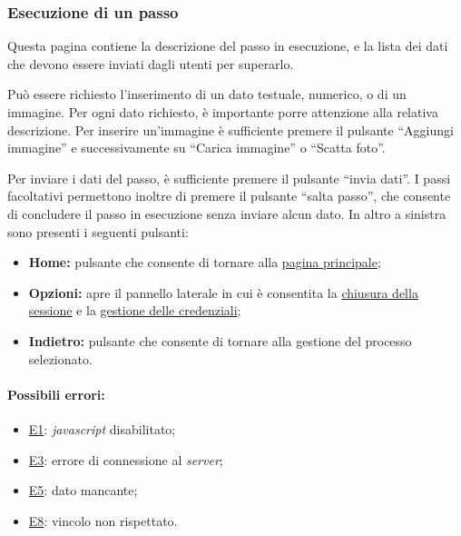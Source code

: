 \subsubsection{Esecuzione di un passo}

Questa pagina contiene la descrizione del passo in esecuzione, e la lista dei dati che devono essere inviati dagli utenti per superarlo.

Può essere richiesto l'inserimento di un dato testuale, numerico, o di un immagine.
Per ogni dato richiesto, è importante porre attenzione alla relativa descrizione.
Per inserire un'immagine è sufficiente premere il pulsante ``Aggiungi immagine'' e successivamente su ``Carica immagine'' o ``Scatta foto''.

Per inviare i dati del passo, è sufficiente premere il pulsante ``invia dati''.
I passi facoltativi permettono inoltre di premere il pulsante ``salta passo'', che consente di concludere il passo in esecuzione senza inviare alcun dato.
In altro a sinistra sono presenti i seguenti pulsanti:
\begin{itemize}
\item \textbf{Home:} pulsante che consente di tornare alla \hyperref[home]{pagina principale};
\item \textbf{Opzioni:} apre il pannello laterale in cui è consentita la \hyperref[logout]{chiusura della sessione} e la \hyperref[userdata]{gestione delle credenziali};
\item \textbf{Indietro:} pulsante che consente di tornare alla gestione del processo selezionato.
\end{itemize}

\paragraph*{Possibili errori:}
\begin{itemize}
\item \hyperref[e1]{E1}: \textit{javascript} disabilitato;
\item \hyperref[e3]{E3}: errore di connessione al \textit{server};
\item \hyperref[e5]{E5}: dato mancante;
\item \hyperref[e8]{E8}: vincolo non rispettato.
\end{itemize}

